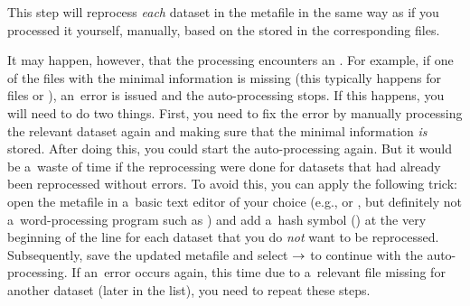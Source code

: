 

\purplebox{}
This step will reprocess \emph{each} dataset in the metafile in the same way as if you processed it yourself, manually, based on the  stored in the corresponding files.
\tcbe





It may happen, however, that the processing encounters an . For example, if one of the files with the minimal information is missing (this typically happens for files  or ), an~error is issued and the auto-processing stops. If this happens, you will need to do two things. First, you need to fix the error by manually processing the relevant dataset again and making sure that the minimal information \emph{is} stored. After doing this, you could start the auto-processing again. But it would be a~waste of time if the reprocessing were done for datasets that had already been reprocessed without errors. To avoid this, you can apply the following trick: open the metafile in a~basic text editor of your choice (e.g.,  or , but definitely not a~word-processing program such as ) and add a~hash symbol (\ttt{\#}) at the very beginning of the line for each dataset that you do \emph{not} want to be reprocessed. Subsequently, save the updated metafile and select  $\rightarrow$  to continue with the auto-processing. If an~error occurs again, this time due to a~relevant file missing for another dataset (later in the list), you need to repeat these steps.
\tcbe

